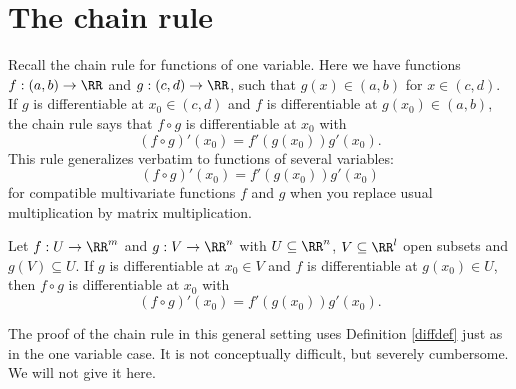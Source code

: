 \documentclass{article}
\begin{document}
\section{The chain rule}

Recall the chain rule for functions of one variable. Here we have
functions $f:(a, b)\rightarrow \RR$ and $g:(c, d)\rightarrow \RR$,
such that $g(x)\in (a, b)$ for $x\in (c, d)$. If $g$ is differentiable at $x_0\in (c, d)$ and $f$
 is
differentiable at $g(x_0)\in (a, b)$, the chain rule says that $f\circ
g$ is differentiable at $x_0$ with
\begin{equation*}
  (f\circ g)'(x_0) = f'(g(x_0)) g'(x_0).
\end{equation*}
This rule generalizes verbatim to functions of several variables:
\begin{equation*}
  (f\circ g)'(x_0) = f'( g(x_0)) g'(x_0)
\end{equation*}
for compatible multivariate functions $f$ and $g$ when you replace
usual multiplication by matrix multiplication. 

\begin{theorem}[emph]\label{chainrule}
  Let $f:U\rightarrow \RR^m$ and $g: V\rightarrow \RR^n$ with
  $U\subseteq \RR^n$, $V\subseteq \RR^l$ open subsets and
  $g(V)\subseteq U$. If $g$ is differentiable at $x_0\in V$ and $f$ is
  differentiable at $g(x_0)\in U$, then $f\circ g$ is differentiable
  at $x_0$ with
  \begin{equation*}
    (f\circ g)'(x_0) = f'( g(x_0)) g'(x_0).
  \end{equation*}
\end{theorem}

The proof of the chain rule in this general setting uses
Definition \ref{diffdef} just as in the one variable
case. It is not conceptually difficult, but severely
cumbersome. We will not give it here.
\end{document}

